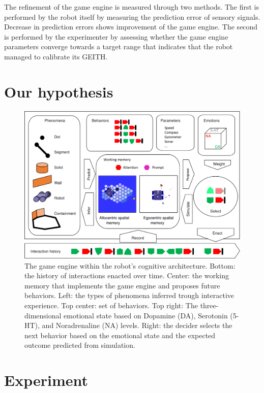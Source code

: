 \documentclass[runningheads]{llncs}
\begin{document}
The refinement of the game engine is measured through two methods. 
The first is performed by the robot itself by measuring the prediction error of sensory signals. 
Decrease in prediction errors shows improvement of the game engine. 
The second is performed by the experimenter by assessing whether the game engine parameters converge towards a target range that indicates that the robot managed to calibrate its GEITH. 




\section{Our hypothesis}

\begin{figure}
	\includegraphics[width=\textwidth]{Figure_geith.pdf}
	\caption{The game engine within the robot's cognitive architecture.
	Bottom: the history of interactions enacted over time.
	Center: the working memory that implements the game engine and proposes future behaviors.
	Left: the types of phenomena inferred trough interactive experience.
	Top center: set of behaviors.
	Top right: The three-dimensional emotional state based on Dopamine (DA), Serotonin (5-HT), and Noradrenaline (NA) levels.
	Right: the decider selects the next behavior based on the emotional state and the expected outcome predicted from simulation.} \label{fig:geith}
\end{figure}



\section{Experiment}
\end{document}
